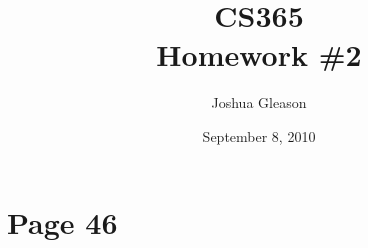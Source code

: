 \documentclass[11pt,a4paper,oneside]{article}
\begin{document}

\title{CS365 \\
       Homework \#2}
\date{September 8, 2010}

\author{Joshua Gleason}

\maketitle
\thispagestyle{empty}

\pagebreak


\section*{Page 46}
\end{document}
